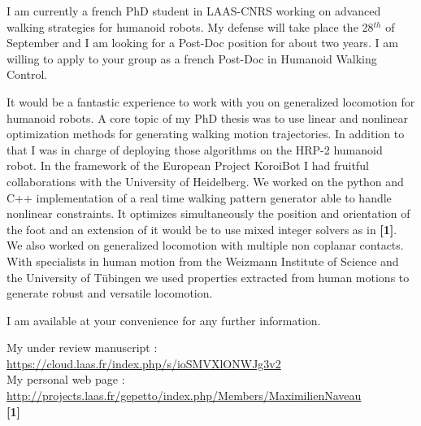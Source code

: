 \documentclass[10pt,stdletter,dateno,sigleft]{newlfm} %
\begin{document}
\begin{newlfm}


I am currently a french PhD student in LAAS-CNRS working on advanced walking strategies for humanoid robots.
My defense will take place the 28$^{th}$ of September and I am looking for a Post-Doc position for about two years.
I am willing to apply to your group as a french Post-Doc in Humanoid Walking Control.

It would be a fantastic experience to work with you on generalized locomotion for humanoid robots.
A core topic of my PhD thesis was to use linear and nonlinear optimization methods for generating walking motion trajectories.
In addition to that I was in charge of deploying those algorithms on the HRP-2 humanoid robot.
In the framework of the European Project KoroiBot I had fruitful collaborations with the University of Heidelberg.
We worked on the python and C++ implementation of a real time walking pattern generator able to handle nonlinear constraints.
It optimizes simultaneously the position and orientation of the foot and an extension of it would be to use mixed integer solvers as in \textbf{[1]}.
We also worked on generalized locomotion with multiple non coplanar contacts.
With specialists in human motion from the Weizmann Institute of Science and the University of T\"ubingen we used properties extracted from human motions to generate robust and versatile locomotion.

I am available at your convenience for any further information.

My under review manuscript : \url{https://cloud.laas.fr/index.php/s/ioSMVXlONWJg3v2}\\
My personal web page : \url{http://projects.laas.fr/gepetto/index.php/Members/MaximilienNaveau}\\
\textbf{[1]} \\


\end{newlfm}
\end{document}
